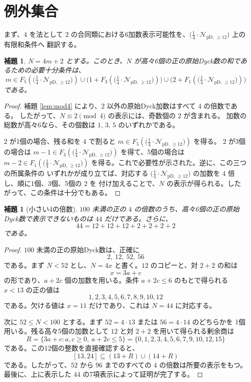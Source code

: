 \documentclass[12pt]{ltjsarticle}
\theoremstyle{plain}
\newtheorem{lemma}[theorem]{補題}
\newcommand{\Pset}{\bigl(\tfrac14\cdot
  \mathcal{N}_{\mathrm{pD},\,\geq12}\bigr)}
\begin{document}
\section{例外集合}\label{sec:exceptions}

まず、$4$ を法として $2$ の合同類における6加数表示可能性を、$\Pset$ 上の有限和条件へ
翻訳する。

\begin{lemma}\label{lem:sixcriterion}
$N=4m+2$ とする。このとき、$N$ が高々6個の正の原始Dyck数の和であるための必要十分条件は、
\[
 m\in F_5(\Pset)
 \cup\bigl(1+F_3(\Pset)\bigr)
 \cup\bigl(2+F_1(\Pset)\bigr)
\]
である。
\end{lemma}

\begin{proof}
補題 \ref{lem:mod4} により、$2$ 以外の原始Dyck加数はすべて $4$ の倍数である。
したがって、$N\equiv2\pmod4$ の表示には、奇数個の $2$ が含まれる。
加数の総数が高々6なら、その個数は $1$, $3$, $5$ のいずれかである。

$2$ が1個の場合、残る和を $4$ で割ると $m\in F_5(\Pset)$ を得る。
$2$ が3個の場合は $m-1\in F_3(\Pset)$ を得て、5個の場合は
$m-2\in F_1(\Pset)$ を得る。これで必要性が示された。逆に、この三つの所属条件の
いずれかが成り立てば、対応する $\Pset$ の加数を $4$ 倍し、順に1個、3個、5個の $2$ を
付け加えることで、$N$ の表示が得られる。したがって、この条件は十分でもある。
\end{proof}

\begin{lemma}[小さい4の倍数]\label{lem:smallmultiples}
$100$ 未満の正の $4$ の倍数のうち、高々6個の正の原始Dyck数で表示できないものは
$44$ だけである。さらに、
\[
 44=12+12+12+2+2+2+2
\]
である。
\end{lemma}

\begin{proof}
$100$ 未満の正の原始Dyck数は、正確に
\[
 2,\ 12,\ 52,\ 56
\]
である。まず $N<52$ とし、$N=4x$ と書く。$12$ のコピーと、対 $2+2$ の和は
\[
 x=3a+c
\]
の形であり、$a+2c$ 個の加数を用いる。条件 $a+2c\leq6$ のもとで得られる
$x<13$ の正の値は
\[
 1,2,3,4,5,6,7,8,9,10,12
\]
である。欠ける値は $x=11$ だけであり、これは $N=44$ に対応する。

次に $52\leq N<100$ とする。まず $52=4\cdot13$ または $56=4\cdot14$ のどちらかを
1個用いる。残る高々5個の加数として $12$ と対 $2+2$ を用いて得られる剰余商は
\[
 R=\{3a+c:a,c\geq0,\ a+2c\leq5\}
   =\{0,1,2,3,4,5,6,7,9,10,12,15\}
\]
である。この12個の整数を直接確認すると、
\[
 [13,24]\subseteq(13+R)\cup(14+R)
\]
である。したがって、$52$ から $96$ までのすべての $4$ の倍数は所要の表示をもつ。
最後に、上に表示した $44$ の7項表示によって証明が完了する。
\end{proof}
\end{document}
